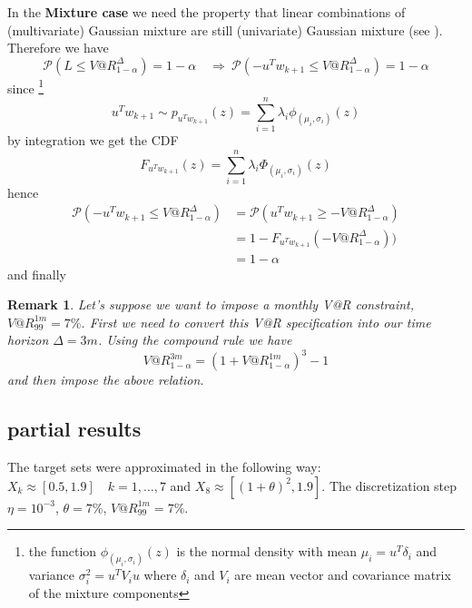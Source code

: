 \documentclass[]{article}
\newtheorem{remark}{Remark}
\begin{document}
In the \textbf{Mixture case} we need the property that linear combinations of (multivariate) Gaussian mixture are still (univariate) Gaussian mixture (see \cite{Mix05}). Therefore we have
\[\mathcal{P}(L \leq V@R_{1-\alpha}^\Delta) = 1-\alpha \quad \Rightarrow\ \mathcal{P}(-u^T w_{k+1} \leq V@R_{1-\alpha}^\Delta) = 1-\alpha     
\] since \footnote{the function $\phi_{(\mu_i,\sigma_i)}(z) $ is the normal density with mean $ \mu_i = u^T \delta_i$ and variance $ \sigma_i^2 = u^T V_i u$ where $\delta_i$ and $V_i$ are mean vector and covariance matrix of the mixture components}
\[u^T w_{k+1} \sim p_{u^T w_{k+1}}(z) = \sum_{i = 1}^{n}\lambda_i \phi_{(\mu_i,\sigma_i)}(z)\] by integration we get the CDF 
\[F_{u^T w_{k+1}}(z) = \sum_{i = 1}^{n}\lambda_i \Phi_{(\mu_i,\sigma_i)}(z)
\]
hence 
\begin{align*}
\mathcal{P}(-u^T w_{k+1} \leq V@R_{1-\alpha}^\Delta) 
&=  \mathcal{P}(u^T w_{k+1} \geq -V@R_{1-\alpha}^\Delta)\\
& = 1 - F_{u^T w_{k+1}}(-V@R_{1-\alpha}^\Delta))  \\
& = 1- \alpha
\end{align*} 
and finally \begin{center}
\end{center}
\begin{remark}
	Let's suppose we want to impose a monthly V@R constraint, $V@R^{1m}_{99} = 7\%$. First we need to convert this V@R specification into our time horizon $\Delta = 3 m$. Using the compound rule we have \[ V@R^{3m}_{1-\alpha} = (1+V@R^{1m}_{1-\alpha})^3-1
	\] and then impose the above relation.
\end{remark}
\subsection{partial results}
The target sets were approximated in the following way:
$X_k \approx [0.5, 1.9] \quad k = 1,\ldots,7$ and $ X_8 \approx [(1+\theta)^2,1.9]$. The discretization step $\eta = 10^{-3}$, $ \theta = 7\%$, $ V@R^{1m}_{99} = 7\%$.
\end{document}
